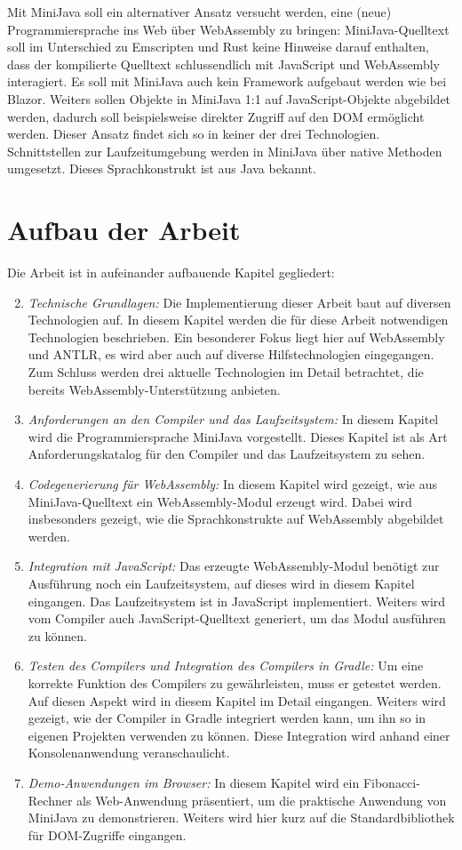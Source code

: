 Mit MiniJava soll ein alternativer Ansatz versucht werden, eine (neue) Programmiersprache ins Web über WebAssembly zu bringen: MiniJava-Quelltext soll im Unterschied zu Emscripten und Rust keine Hinweise darauf enthalten, dass der kompilierte Quelltext schlussendlich mit JavaScript und WebAssembly interagiert. Es soll mit MiniJava auch kein Framework aufgebaut werden wie bei Blazor. Weiters sollen Objekte in MiniJava 1:1 auf JavaScript-Objekte abgebildet werden, dadurch soll beispielsweise direkter Zugriff auf den DOM ermöglicht werden. Dieser Ansatz findet sich so in keiner der drei Technologien. Schnittstellen zur Laufzeitumgebung werden in MiniJava über native Methoden umgesetzt. Dieses Sprachkonstrukt ist aus Java bekannt.

\section{Aufbau der Arbeit}

Die Arbeit ist in aufeinander aufbauende Kapitel gegliedert:
\begin{enumerate}
    \setcounter{enumi}{1}
    \item \emph{Technische Grundlagen:} Die Implementierung dieser Arbeit baut auf diversen Technologien auf. In diesem Kapitel werden die für diese Arbeit notwendigen Technologien beschrieben. Ein besonderer Fokus liegt hier auf WebAssembly und ANTLR, es wird aber auch auf diverse Hilfstechnologien eingegangen. Zum Schluss werden drei aktuelle Technologien im Detail betrachtet, die bereits WebAssembly-Unterstützung anbieten.
    \item \emph{Anforderungen an den Compiler und das Laufzeitsystem:} In diesem Kapitel wird die Programmiersprache MiniJava vorgestellt. Dieses Kapitel ist als Art Anforderungskatalog für den Compiler und das Laufzeitsystem zu sehen.
    \item \emph{Codegenerierung für WebAssembly:} In diesem Kapitel wird gezeigt, wie aus Mi\-ni\-Ja\-va-Quell\-text ein WebAssembly-Modul erzeugt wird. Dabei wird insbesonders gezeigt, wie die Sprachkonstrukte auf WebAssembly abgebildet werden. 
    \item \emph{Integration mit JavaScript:} Das erzeugte WebAssembly-Modul benötigt zur Ausführung noch ein Laufzeitsystem, auf dieses wird in diesem Kapitel eingangen. Das Laufzeitsystem ist in JavaScript implementiert. Weiters wird vom Compiler auch JavaScript-Quelltext generiert, um das Modul ausführen zu können.
    \item \emph{Testen des Compilers und Integration des Compilers in Gradle:} Um eine korrekte Funktion des Compilers zu gewährleisten, muss er getestet werden. Auf diesen Aspekt wird in diesem Kapitel im Detail eingangen. Weiters wird gezeigt, wie der Compiler in Gradle integriert werden kann, um ihn so in eigenen Projekten verwenden zu können. Diese Integration wird anhand einer Konsolenanwendung veranschaulicht.
    \item \emph{Demo-Anwendungen im Browser:} In diesem Kapitel wird ein Fibonacci-Rechner als Web-Anwendung präsentiert, um die praktische Anwendung von MiniJava zu demonstrieren. Weiters wird hier kurz auf die Standardbibliothek für DOM-Zugriffe eingangen.
\end{enumerate}

